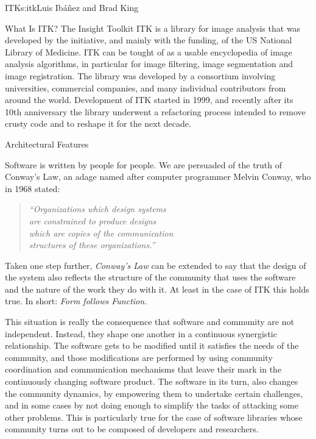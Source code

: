 \begin{aosachapter}{ITK}{s:itk}{Luis Ib\'{a}\~{n}ez and Brad King}



\begin{aosasect1}{What Is ITK?}
The Insight Toolkit ITK is a library for image analysis that was developed by
the initiative, and mainly with the funding, of the US National Library of
Medicine. ITK can be tought of as a usable encyclopedia of image analysis
algorithms, in particular for image filtering, image segmentation and image
registration. The library was developed by a consortium involving universities,
commercial companies, and many individual contributors from around the world.
Development of ITK started in 1999, and recently after its 10th anniversary
the library underwent a refactoring process intended to remove crusty code and
to reshape it for the next decade.
\end{aosasect1}

\begin{aosasect1}{Architectural Features}

Software is written by people for people. We are persuaded of the truth of Conway's Law,
an adage named after computer programmer Melvin Conway, who in 1968 stated:

\begin{center}
\begin{quotation}
\emph{
``Organizations which design systems\\
are constrained to produce designs\\
which are copies of the communication\\
structures of these organizations.''
}
\end{quotation}
\end{center}

Taken one step further, \emph{Conway's Law} can be extended to say that the
design of the system also reflects the structure of the community that uses the
software and the nature of the work they do with it. At least in the case of
ITK this holds true. In short: \emph{Form follows Function}.

This situation is really the consequence that software and community are not
independent. Instead, they shape one another in a continuous synergistic
relationship. The software gets to be modified until it satisfies the needs of
the community, and those modifications are performed by using community
coordination and communication mechanisms that leave their mark in the
continuously changing software product. The software in its turn, also changes
the community dynamics, by empowering them to undertake certain challenges, and
in some cases by not doing enough to simplify the tasks of attacking some other
problems. This is particularly true for the case of software libraries whose
community turns out to be composed of developers and researchers.


\end{aosasect1}
\end{aosachapter}
